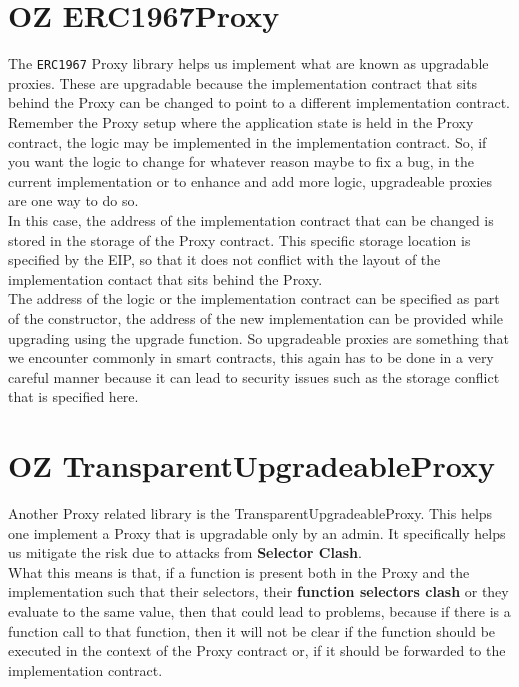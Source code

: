 \section{OZ ERC1967Proxy}
The \verb|ERC1967| Proxy library helps us implement what are known as upgradable proxies. These are upgradable because the implementation contract that sits behind the Proxy can be changed to point to a different implementation contract.\\

Remember the Proxy setup where the application state is held in the Proxy contract, the logic may be implemented in the implementation contract. So, if you want the logic to change for whatever reason maybe to fix a bug, in the current implementation or to enhance and add more logic, upgradeable proxies are one way to do so.\\

In this case, the address of the implementation contract that can be changed is stored in the storage of the Proxy contract. This specific storage location is specified by the EIP, so that it does not conflict with the layout of the implementation contact that sits behind the Proxy.\\

The address of the logic or the implementation contract can be specified as part of the constructor, the address of the new implementation can be provided while upgrading using the upgrade function. So upgradeable proxies are something that we encounter commonly in smart contracts, this again has to be done in a very careful manner because it can lead to security issues such as the storage conflict that is specified here.

\section{OZ TransparentUpgradeableProxy}
Another Proxy related library is the TransparentUpgradeableProxy. This helps one implement a Proxy that is upgradable only by an admin.  It specifically helps us mitigate the risk due to attacks from \textbf{Selector Clash}.\\

What this means is that, if a function is present both in the Proxy and the implementation such that their selectors, their \textbf{function selectors clash} or they evaluate to the same value, then that could lead to problems, because if there is a function call to that function, then it will not be clear if the function should be executed in the context of the Proxy contract or, if it should be forwarded to the implementation contract.\\

